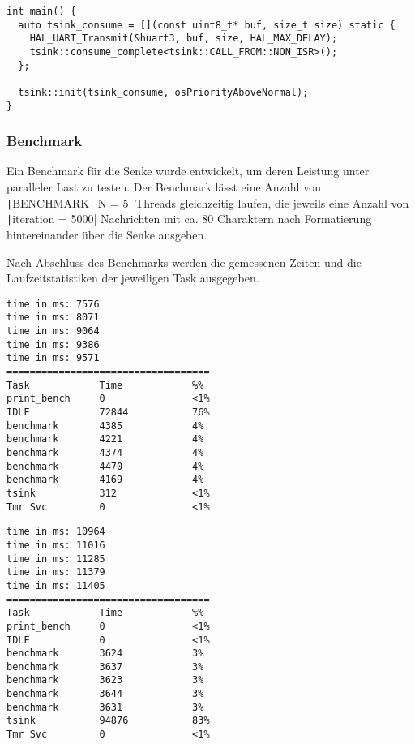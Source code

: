\begin{code}
\begin{verbatim}
int main() {
  auto tsink_consume = [](const uint8_t* buf, size_t size) static {
    HAL_UART_Transmit(&huart3, buf, size, HAL_MAX_DELAY);
    tsink::consume_complete<tsink::CALL_FROM::NON_ISR>();
  };

  tsink::init(tsink_consume, osPriorityAboveNormal);
}
\end{verbatim}
\end{code}

\subsubsection{Benchmark}

Ein Benchmark für die Senke wurde entwickelt, um deren Leistung unter paralleler
Last zu testen. Der Benchmark lässt eine Anzahl von
\texttt|BENCHMARK_N = 5| Threads gleichzeitig laufen, die jeweils eine
Anzahl von \texttt|iteration = 5000| Nachrichten mit ca. 80 Charaktern
nach Formatierung hintereinander über die Senke ausgeben.

Nach Abschluss des Benchmarks werden die gemessenen Zeiten und die
Laufzeitstatistiken der jeweiligen Task ausgegeben.

\begin{minipage}[t]{0.5\textwidth}
    \begin{code}
        \begin{verbatim}
time in ms: 7576
time in ms: 8071
time in ms: 9064
time in ms: 9386
time in ms: 9571
===================================
Task            Time            %%
print_bench     0               <1%
IDLE            72844           76%
benchmark       4385            4%
benchmark       4221            4%
benchmark       4374            4%
benchmark       4470            4%
benchmark       4169            4%
tsink           312             <1%
Tmr Svc         0               <1%
    \end{verbatim}
    \end{code}
\end{minipage}
\hfill
\begin{minipage}[t]{0.5\textwidth}
    \begin{code}
        \begin{verbatim}
time in ms: 10964
time in ms: 11016
time in ms: 11285
time in ms: 11379
time in ms: 11405
===================================
Task            Time            %%
print_bench     0               <1%
IDLE            0               <1%
benchmark       3624            3%
benchmark       3637            3%
benchmark       3623            3%
benchmark       3644            3%
benchmark       3631            3%
tsink           94876           83%
Tmr Svc         0               <1%
    \end{verbatim}
    \end{code}
\end{minipage}

